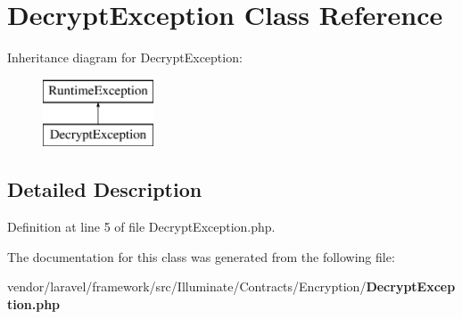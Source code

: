 \section{Decrypt\+Exception Class Reference}
\label{class_illuminate_1_1_contracts_1_1_encryption_1_1_decrypt_exception}
Inheritance diagram for Decrypt\+Exception\+:\begin{figure}[H]
\begin{center}
\leavevmode
\includegraphics[height=2.000000cm]{class_illuminate_1_1_contracts_1_1_encryption_1_1_decrypt_exception}
\end{center}
\end{figure}


\subsection{Detailed Description}


Definition at line 5 of file Decrypt\+Exception.\+php.



The documentation for this class was generated from the following file\+:\begin{DoxyCompactItemize}
\item 
vendor/laravel/framework/src/\+Illuminate/\+Contracts/\+Encryption/{\bf Decrypt\+Exception.\+php}\end{DoxyCompactItemize}

